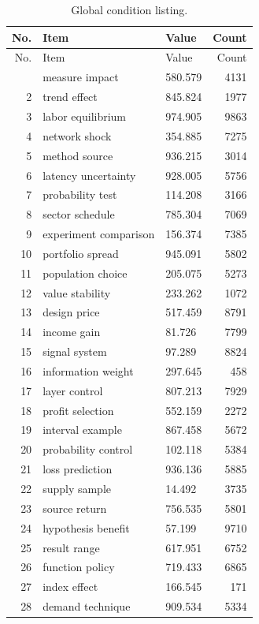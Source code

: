 \documentclass[11pt]{report}
\begin{document}
\begin{longtable}{rllr}\caption{Global condition listing.}\label{tab:l8}\\\toprule No. & Item & Value & Count \\ \midrule \endfirsthead\toprule No. & Item & Value & Count \\ \midrule \endhead\bottomrule \endfoot
1 & measure impact & 580.579 & 4131 \\
2 & trend effect & 845.824 & 1977 \\
3 & labor equilibrium & 974.905 & 9863 \\
4 & network shock & 354.885 & 7275 \\
5 & method source & 936.215 & 3014 \\
6 & latency uncertainty & 928.005 & 5756 \\
7 & probability test & 114.208 & 3166 \\
8 & sector schedule & 785.304 & 7069 \\
9 & experiment comparison & 156.374 & 7385 \\
10 & portfolio spread & 945.091 & 5802 \\
11 & population choice & 205.075 & 5273 \\
12 & value stability & 233.262 & 1072 \\
13 & design price & 517.459 & 8791 \\
14 & income gain & 81.726 & 7799 \\
15 & signal system & 97.289 & 8824 \\
16 & information weight & 297.645 & 458 \\
17 & layer control & 807.213 & 7929 \\
18 & profit selection & 552.159 & 2272 \\
19 & interval example & 867.458 & 5672 \\
20 & probability control & 102.118 & 5384 \\
21 & loss prediction & 936.136 & 5885 \\
22 & supply sample & 14.492 & 3735 \\
23 & source return & 756.535 & 5801 \\
24 & hypothesis benefit & 57.199 & 9710 \\
25 & result range & 617.951 & 6752 \\
26 & function policy & 719.433 & 6865 \\
27 & index effect & 166.545 & 171 \\
28 & demand technique & 909.534 & 5334 \\

\end{longtable}
\end{document}
